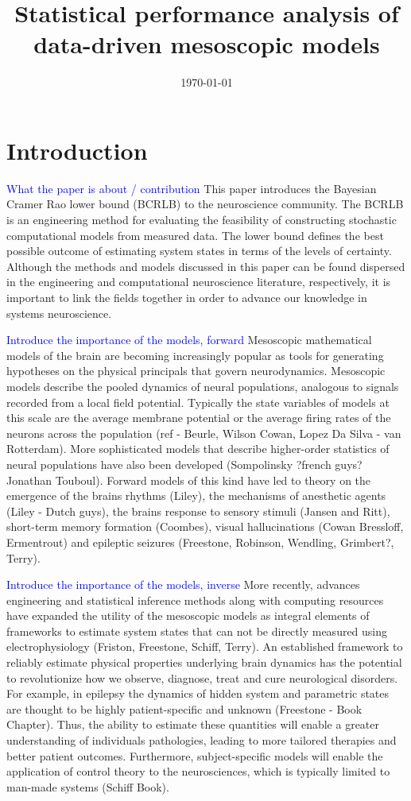 \documentclass{article}
\title{Statistical performance analysis of data-driven mesoscopic models}
\date{\today}
\newcommand{\brian}[1]{\textcolor{blue}{#1}}
\begin{document}
\maketitle

\section{Introduction}
\label{sec:introduction}

\brian{What the paper is about / contribution}
This paper introduces the Bayesian Cramer Rao lower bound (BCRLB) to the neuroscience community. The BCRLB is an engineering method for evaluating the feasibility of constructing stochastic computational models from measured data. The lower bound defines the best possible outcome of estimating system states in terms of the levels of certainty. Although the methods and models discussed in this paper can be found dispersed in the engineering and computational neuroscience literature, respectively, it is important to link the fields together in order to advance our knowledge in systems neuroscience. 

\brian{Introduce the importance of the models, forward}
Mesoscopic mathematical models of the brain are becoming increasingly popular as tools for generating hypotheses on the physical principals that govern neurodynamics. Mesoscopic models describe the pooled dynamics of neural populations, analogous to signals recorded from a local field potential. Typically the state variables of models at this scale are the average membrane potential or the average firing rates of the neurons across the population (ref - Beurle, Wilson Cowan, Lopez Da Silva - van Rotterdam). More sophisticated models that describe higher-order statistics of neural populations have also been developed (Sompolinsky ?french guys? Jonathan Touboul). Forward models of this kind have led to theory on the emergence of the brains rhythms (Liley), the mechanisms of anesthetic agents (Liley - Dutch guys), the brains response to sensory stimuli (Jansen and Ritt), short-term memory formation (Coombes), visual hallucinations (Cowan Bressloff, Ermentrout) and epileptic seizures (Freestone, Robinson, Wendling, Grimbert?, Terry). 

\brian{Introduce the importance of the models, inverse}
More recently, advances engineering and statistical inference methods along with computing resources have expanded the utility of the mesoscopic models as integral elements of frameworks to estimate system states that can not be directly measured using electrophysiology (Friston, Freestone, Schiff, Terry). An established framework to reliably estimate physical properties underlying brain dynamics has the potential to revolutionize how we observe, diagnose, treat and cure neurological disorders. For example, in epilepsy the dynamics of hidden system and parametric states are thought to be highly patient-specific and unknown (Freestone - Book Chapter). Thus, the ability to estimate these quantities will enable a greater understanding of individuals pathologies, leading to more tailored therapies and better patient outcomes.  Furthermore, subject-specific models will enable the application of control theory to the neurosciences, which is typically limited to man-made systems (Schiff Book).
\end{document}
